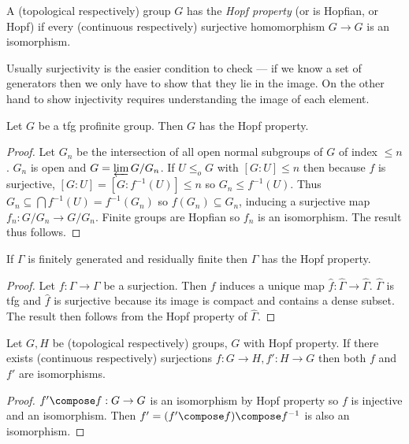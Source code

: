 \documentclass[a4paper]{article}
\begin{document}
\begin{definition}
  A (topological respectively) group \(G\) has the \emph{Hopf property} (or is Hopfian, or Hopf) if every (continuous respectively) surjective homomorphism \(G \to G\) is an isomorphism.
\end{definition}

Usually surjectivity is the easier condition to check --- if we know a set of generators then we only have to show that they lie in the image. On the other hand to show injectivity requires understanding the image of each element.

\begin{proposition}
  Let \(G\) be a tfg profinite group. Then \(G\) has the Hopf property.
\end{proposition}

\begin{proof}
  Let \(G_n\) be the intersection of all open normal subgroups of \(G\) of index \(\leq n\). \(G_n\) is open and \(G = \varprojlim G/G_n\). If \(U \leq_o G\) with \([G: U] \leq n\) then because \(f\) is surjective, \([G: U] = [G: f^{-1}(U)] \leq n\) so \(G_n \leq f^{-1}(U)\). Thus \(G_n \subseteq \bigcap f^{-1}(U) = f^{-1}(G_n)\) so \(f(G_n) \subseteq G_n\), inducing a surjective map \(f_n: G/G_n \to G/G_n\). Finite groups are Hopfian so \(f_n\) is an isomorphism. The result thus follows.
\end{proof}

\begin{corollary}
  If \(\Gamma\) is finitely generated and residually finite then \(\Gamma\) has the Hopf property.
\end{corollary}

\begin{proof}
  Let \(f: \Gamma \to \Gamma\) be a surjection. Then \(f\) induces a unique map \(\hat f: \hat \Gamma \to \hat \Gamma\). \(\hat \Gamma\) is tfg and \(\hat f\) is surjective because its image is compact and contains a dense subset. The result then follows from the Hopf property of \(\hat \Gamma\).
\end{proof}

\begin{proposition}
  Let \(G, H\) be (topological respectively) groups, \(G\) with Hopf property. If there exists (continuous respectively) surjections \(f: G \to H, f': H \to G\) then both \(f\) and \(f'\) are isomorphisms.
\end{proposition}

\begin{proof}
  \(f' \compose f: G \to G\) is an isomorphism by Hopf property so \(f\) is injective and an isomorphism. Then \(f' = (f'\compose f) \compose f^{-1}\) is also an isomorphism.
\end{proof}
\end{document}
